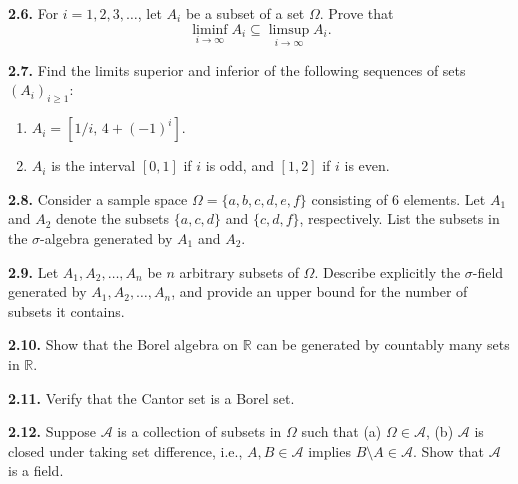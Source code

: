 \textbf{2.6.} For $i=1,2,3,\dots$, let $A_i$ be a subset of a set $\Omega$. Prove that
\[
\liminf_{i\to\infty} A_i \subseteq \limsup_{i\to\infty} A_i.
\]

\textbf{2.7.} Find the limits superior and inferior of the following sequences of sets $(A_i)_{i\ge 1}$:
\begin{enumerate}[label=(\alph*)]
    \item $A_i=[1/i,\, 4+(-1)^i]$.
    \item $A_i$ is the interval $[0,1]$ if $i$ is odd, and $[1,2]$ if $i$ is even.
\end{enumerate}

\textbf{2.8.} Consider a sample space $\Omega=\{a,b,c,d,e,f\}$ consisting of $6$ elements. Let $A_1$ and $A_2$ denote the subsets $\{a,c,d\}$ and $\{c,d,f\}$, respectively. List the subsets in the $\sigma$-algebra generated by $A_1$ and $A_2$.

\textbf{2.9.} Let $A_1,A_2,\dots,A_n$ be $n$ arbitrary subsets of $\Omega$. Describe explicitly the $\sigma$-field generated by $A_1,A_2,\dots,A_n$, and provide an upper bound for the number of subsets it contains.

\textbf{2.10.} Show that the Borel algebra on $\mathbb{R}$ can be generated by countably many sets in $\mathbb{R}$.

\textbf{2.11.} Verify that the Cantor set is a Borel set.

\textbf{2.12.} Suppose $\mathcal{A}$ is a collection of subsets in $\Omega$ such that (a) $\Omega\in \mathcal{A}$, (b) $\mathcal{A}$ is closed under taking set difference, i.e., $A,B\in \mathcal{A}$ implies $B\setminus A\in \mathcal{A}$. Show that $\mathcal{A}$ is a field.
